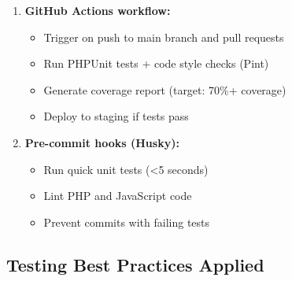 \begin{enumerate}
    \item \textbf{GitHub Actions workflow:}
    \begin{itemize}
        \item Trigger on push to main branch and pull requests
        \item Run PHPUnit tests + code style checks (Pint)
        \item Generate coverage report (target: 70\%+ coverage)
        \item Deploy to staging if tests pass
    \end{itemize}
    
    \item \textbf{Pre-commit hooks (Husky):}
    \begin{itemize}
        \item Run quick unit tests (<5 seconds)
        \item Lint PHP and JavaScript code
        \item Prevent commits with failing tests
    \end{itemize}
\end{enumerate}

\subsection{Testing Best Practices Applied}

